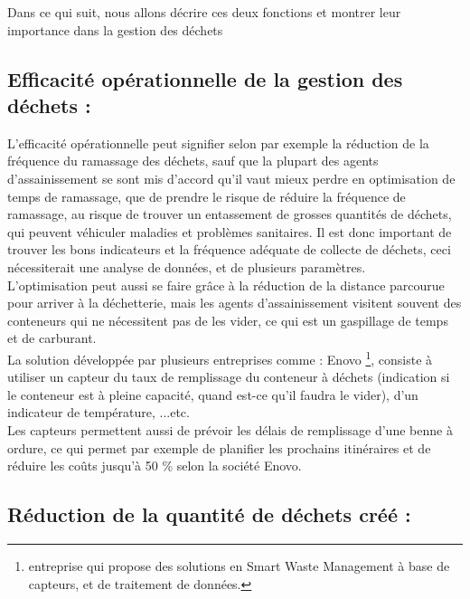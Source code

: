 \documentclass[a4paper,12pt]{report}
\begin{document}
Dans ce qui suit, nous allons décrire ces deux fonctions et montrer leur importance dans la gestion des déchets 
\subsection{Efficacité opérationnelle de la gestion des déchets :} 

L’efficacité opérationnelle peut signifier selon \cite{ref2} par exemple la réduction de la fréquence du ramassage des déchets, sauf que la plupart des agents d’assainissement se sont mis d’accord qu’il vaut mieux perdre en optimisation de temps de ramassage, que de prendre le risque de réduire la fréquence de ramassage, au risque de trouver un entassement de grosses quantités de déchets, qui peuvent véhiculer maladies et problèmes sanitaires. Il est donc important de trouver les bons indicateurs et la fréquence adéquate de collecte de déchets, ceci nécessiterait une analyse de données, et de plusieurs paramètres. \\ 
 
L’optimisation peut aussi se faire grâce à la réduction de la distance parcourue pour arriver à la déchetterie, mais les agents d’assainissement visitent souvent des conteneurs qui ne nécessitent pas de les vider, ce qui est un gaspillage de temps et de carburant.\\
 
La solution développée par plusieurs entreprises comme : Enovo \footnote{entreprise qui propose des solutions en Smart Waste Management à base de capteurs, et de traitement de données.}, consiste à utiliser un capteur du taux de remplissage du conteneur à déchets (indication si le conteneur est à pleine capacité, quand est-ce qu’il faudra le vider), d’un indicateur de température, ...etc.\\ 
Les capteurs permettent aussi de prévoir les délais de remplissage d’une benne à ordure, ce qui permet par exemple de planifier les prochains itinéraires et de réduire les coûts jusqu’à 50 \% selon la société Enovo.\\
 
\subsection{Réduction de la quantité de déchets créé :}
 
\end{document}
